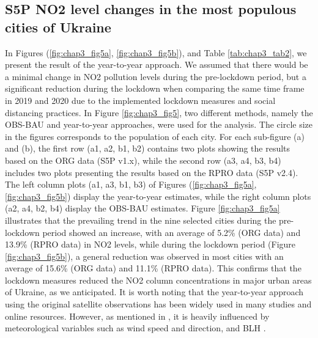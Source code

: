 \subsection{S5P NO2 level changes in the most populous cities of Ukraine}
In Figures (\ref{fig:chap3_fig5a}, \ref{fig:chap3_fig5b}), and Table \ref{tab:chap3_tab2}, we present the result of the year-to-year approach. We assumed that there would be a minimal change in NO2 pollution levels during the pre-lockdown period, but a significant reduction during the lockdown when comparing the same time frame in 2019 and 2020 due to the implemented lockdown measures and social distancing practices. In Figure \ref{fig:chap3_fig5}, two different methods, namely the OBS-BAU and year-to-year approaches, were used for the analysis. The circle size in the figures corresponds to the population of each city. For each sub-figure (a) and (b), the first row (a1, a2, b1, b2) contains two plots showing the results based on the ORG data (S5P v1.x), while the second row (a3, a4, b3, b4) includes two plots presenting the results based on the RPRO data (S5P v2.4). The left column plots (a1, a3, b1, b3) of Figures (\ref{fig:chap3_fig5a}, \ref{fig:chap3_fig5b}) display the year-to-year estimates, while the right column plots (a2, a4, b2, b4) display the OBS-BAU estimates. Figure \ref{fig:chap3_fig5a} illustrates that the prevailing trend in the nine selected cities during the pre-lockdown period showed an increase, with an average of 5.2\% (ORG data) and 13.9\% (RPRO data) in NO2 levels, while during the lockdown period (Figure \ref{fig:chap3_fig5b}), a general reduction was observed in most cities with an average of 15.6\% (ORG data) and 11.1\% (RPRO data). This confirms that the lockdown measures reduced the NO2 column concentrations in major urban areas of Ukraine, as we anticipated. It is worth noting that the year-to-year approach using the original satellite observations has been widely used in many studies and online resources. However, as mentioned in \citep{barre2021estimating,grange2021covid}, it is heavily influenced by meteorological variables such as wind speed and direction, and BLH \citep{wallace2009effect}.\par

